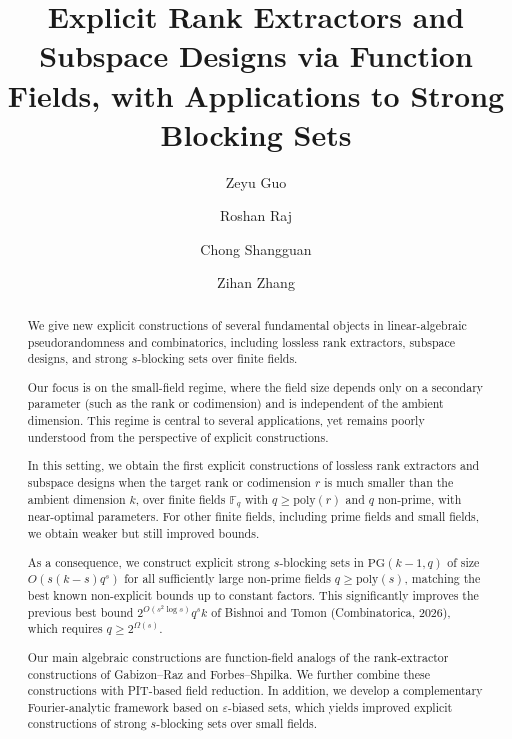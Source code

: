 \documentclass[11pt]{article}
\begin{document}
\date{}
\title{Explicit Rank Extractors and Subspace Designs via Function Fields, with Applications to Strong Blocking Sets}


\author{
Zeyu Guo\footnotemark[1]
\and
Roshan Raj\footnotemark[1]
\and
Chong Shangguan\footnotemark[2]
\and
Zihan Zhang\footnotemark[1]
}

\makeatletter
\def\thanks#1{\protected@xdef\@thanks{\@thanks
        \protect\footnotetext{#1}}}
\makeatother


\maketitle
\begin{abstract}
We give new explicit constructions of several fundamental objects in linear-algebraic pseudorandomness and combinatorics, including lossless rank extractors, subspace designs, and strong $s$-blocking sets over finite fields.

Our focus is on the small-field regime, where the field size depends only on a secondary parameter (such as the rank or codimension) and is independent of the ambient dimension. This regime is central to several applications, yet remains poorly understood from the perspective of explicit constructions.

In this setting, we obtain the first explicit constructions of lossless rank extractors and subspace designs when the target rank or codimension $r$ is much smaller than the ambient dimension $k$, over finite fields $\mathbb{F}_q$ with $q \ge \mathrm{poly}(r)$ and $q$ non-prime, with near-optimal parameters. For other finite fields, including prime fields and small fields, we obtain weaker but still improved bounds.

As a consequence, we construct explicit strong $s$-blocking sets in $\mathrm{PG}(k-1,q)$ of size $O(s(k-s)q^s)$ for all sufficiently large non-prime fields $q \ge \mathrm{poly}(s)$, matching the best known non-explicit bounds up to constant factors. This significantly improves the previous best bound $2^{O(s^2 \log s)} q^s k$ of Bishnoi and Tomon (Combinatorica, 2026), which requires $q \ge 2^{\Omega(s)}$.

Our main algebraic constructions are function-field analogs of the rank-extractor constructions of Gabizon--Raz and Forbes--Shpilka. We further combine these constructions with PIT-based field reduction. In addition, we develop a complementary Fourier-analytic framework based on $\varepsilon$-biased sets, which yields improved explicit constructions of strong $s$-blocking sets over small fields.
\end{abstract}
\end{document}
